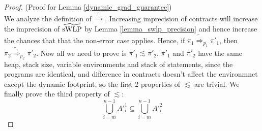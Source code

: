 \documentclass {article}
\newcommand{\imp}{\Rightarrow}
\begin{document}
\begin{proof} (Proof for Lemma \ref{dynamic_grad_guarantee})\\
We analyze the definition of $\widetilde{\rightarrow}$. Increasing imprecision of contracts will increase the imprecision of $\widetilde{\textup{sWLP}}$ by Lemma \ref{lemma_swlp_precision} and hence increase the chances that that the non-error case applies. Hence, if $\pi_1 \widetilde{\imp}_{p_1} \pi'_1$, then $\pi_2 \widetilde{\imp}_{p_2} \pi'_2$. Now all we need to prove is $\pi'_1 \lesssim \pi'_2$. $\pi'_1$ and $\pi'_2$ have the same heap, stack size, variable environments and stack of statements, since the programs are identical, and difference in contracts doesn't affect the environmnet except the dynamic footprint, so the first 2 properties of $\lesssim$ are trivial. We finally prove the third property of $\lesssim$: $$\bigcup_{i = m}^{n - 1} A'^1_i  \subseteq \bigcup_{i=m}^{n - 1} A'^2_i$$


\end{proof}
\end{document}
